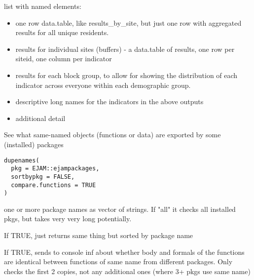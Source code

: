 \documentclass[a4paper]{book}
\begin{document}
\begin{Value}
list with named elements:
\begin{itemize}

\item{}    one row data.table, like results\_by\_site, but just one row with
aggregated results for all unique residents.
\item{}    results for individual sites (buffers) - a data.table of results,
one row per siteid, one column per indicator
\item{}   results for each block group, to allow for showing the distribution of each
indicator across everyone within each demographic group.
\item{}   descriptive long names for the indicators in the above outputs
\item{}   additional detail

\end{itemize}

\end{Value}
%
\begin{SeeAlso}\relax
{}   
\end{SeeAlso}
%
\begin{Description}\relax
See what same-named objects (functions or data) are exported by some (installed) packages
\end{Description}
%
\begin{Usage}
\begin{verbatim}
dupenames(
  pkg = EJAM::ejampackages,
  sortbypkg = FALSE,
  compare.functions = TRUE
)
\end{verbatim}
\end{Usage}
%
\begin{Arguments}
\begin{ldescription}
\item[\code{pkg}] one or more package names as vector of strings.
If "all" it checks all installed pkgs, but takes very very long potentially.

\item[\code{sortbypkg}] If TRUE, just returns same thing but sorted by package name

\item[\code{compare.functions}] If TRUE, sends to console inf about whether body and formals
of the functions are identical between functions of same name from different packages.
Only checks the first 2 copies, not any additional ones (where 3+ pkgs use same name)
\end{ldescription}
\end{Arguments}
\end{document}

